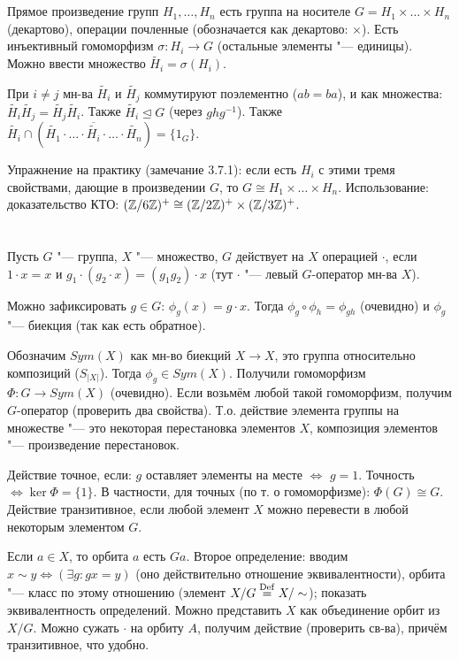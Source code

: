 \section{} %
Прямое произведение групп $H_1, \dots, H_n$ есть группа на носителе $G=H_1 \times \dots \times H_n$
(декартово), операции почленные (обозначается как декартово: $\times$).
Есть инъективный гомоморфизм $\sigma \colon H_i \to G$ (остальные элементы "--- единицы).
Можно ввести множество $\widetilde{H_i}=\sigma(H_i)$.

При $i \neq j$ мн-ва $\widetilde{H_i}$ и $\widetilde{H_j}$ коммутируют поэлементно ($ab=ba$),
и как множества: $\widetilde{H_i}\widetilde{H_j}=\widetilde{H_j}\widetilde{H_i}$.
Также $\widetilde{H_i} \unlhd G$ (через $ghg^{-1}$).
Также $\widetilde{H_i} \cap (\widetilde{H_1}\cdot \dots \cdot \overbar{\widetilde{H_i}} \cdot \dots \cdot \widetilde{H_n})=\{1_G\}$.

Упражнение на практику (\TODO замечание 3.7.1): если есть $H_i$ с этими тремя свойствами, дающие в произведении
$G$, то $G \cong H_1 \times \dots \times H_n$.
Использование: доказательство КТО: $(\mathbb{Z}/6\mathbb{Z})^+ \cong (\mathbb{Z}/2\mathbb{Z})^+ \times (\mathbb{Z}/3\mathbb{Z})^+$.

\section{} %
Пусть $G$ "--- группа, $X$ "--- множество, $G$ действует на $X$ операцией $\cdot$,
если $1\cdot x = x$ и $g_1\cdot(g_2 \cdot x)=(g_1g_2)\cdot x$ (тут $\cdot$ "--- левый
$G$-оператор мн-ва $X$).

Можно зафиксировать $g\in G$: $\phi_g(x) = g \cdot x$.
Тогда $\phi_g \circ \phi_h = \phi_{gh}$ (очевидно) и $\phi_g$ "--- биекция
(так как есть обратное).

Обозначим $Sym(X)$ как мн-во биекций $X \to X$, это группа относительно композиций ($S_{|X|}$).
Тогда $\phi_g \in Sym(X)$.
Получили гомоморфизм $\Phi \colon G \to Sym(X)$ (очевидно).
Если возьмём любой такой гомоморфизм, получим $G$-оператор
(проверить два свойства).
Т.о. действие элемента группы на множестве "--- это некоторая перестановка элементов $X$,
композиция элементов "--- произведение перестановок.

Действие точное, если: $g$ оставляет элементы на месте $\iff$ $g=1$.
Точность $\iff \ker \Phi =\{1\}$.
В частности, для точных (по т. о гомоморфизме): $\Phi(G) \cong G$.
Действие транзитивное, если любой элемент $X$ можно перевести в любой некоторым элементом $G$.

Если $a \in X$, то орбита $a$ есть $Ga$.
Второе определение: вводим $x \sim y \iff (\exists g \colon gx=y)$ (оно
действительно отношение эквивалентности), орбита "--- класс по этому отношению
(элемент $X/G \stackrel{\mathrm{Def}}{=} X/\sim$); показать эквивалентность определений.
Можно представить $X$ как объединение орбит из $X/G$.
Можно сужать $\cdot$ на орбиту $A$, получим действие (проверить св-ва),
причём транзитивное, что удобно.

